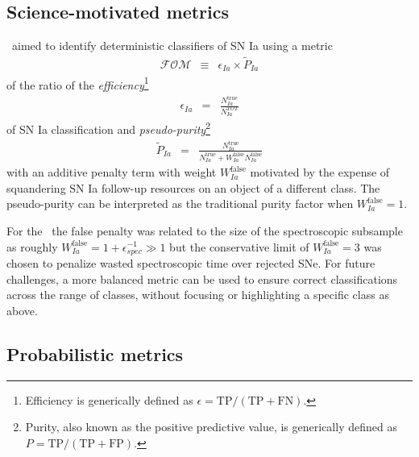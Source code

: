 \subsection{Science-motivated metrics}
\label{sec:science}


\snphotcc\ aimed to identify deterministic classifiers of SN Ia using a metric
\begin{eqnarray}
  \label{eq:snphotccfom}
  \mathcal{FOM} &\equiv& \epsilon_{Ia} \times \tilde{P}_{Ia}
\end{eqnarray}
of the ratio of the \textit{efficiency}\footnote{Efficiency is generically defined as $\epsilon = \mathrm{TP} / (\mathrm{TP} + \mathrm{FN})$.}
\begin{eqnarray}
  \label{eq:efficiency}
  \epsilon_{Ia} &=& \frac{N_{Ia}^{\mathrm{true}}}{N_{Ia}^{TOT}}
\end{eqnarray}
of SN Ia classification and \textit{pseudo-purity}\footnote{Purity, also known as the positive predictive value, is generically defined as $P = \mathrm{TP} / (\mathrm{TP} + \mathrm{FP})$.}
\begin{eqnarray}
  \label{eq:pseudopurity}
  \tilde{P}_{Ia} &=& \frac{N_{Ia}^{\mathrm{true}}}{N_{Ia}^\mathrm{true} + W_{Ia}^\mathrm{false}N_{Ia}^\mathrm{false}}
\end{eqnarray}
with an additive penalty term with weight $W_{Ia}^\mathrm{false}$ motivated by the expense of squandering SN Ia follow-up resources on an object of a different class.
The pseudo-purity can be interpreted as the traditional purity factor when $W_{Ia}^\mathrm{false} = 1$.

For the \snphotcc\ the false penalty was related to the size of the spectroscopic subsample as roughly $W_{Ia}^\mathrm{false} = 1 + \epsilon_{spec}^{-1} \gg 1$ but the conservative limit of $W_{Ia}^\mathrm{false} = 3$ was chosen to penalize wasted spectroscopic time over rejected SNe.
For future challenges, a more balanced metric can be used to ensure correct classifications across the range of classes, without focusing or highlighting a specific class as above.



\subsection{Probabilistic metrics}
\label{sec:probabilistic}

